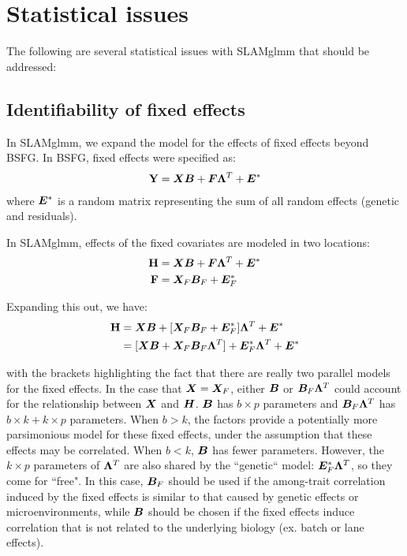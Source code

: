 \documentclass[11pt]{amsart}
\newcommand*{\B}[1]{\ifmmode\bm{#1}\else\textbf{#1}\fi}
\begin{document}
\section{Statistical issues}
The following are several statistical issues with SLAMglmm that should be addressed:

\subsection{Identifiability of fixed effects}
In SLAMglmm, we expand the model for the effects of fixed effects beyond BSFG. In BSFG, fixed effects were specified as:
\begin{align*}
\B{Y} = \B{X}\B{B} + \B{F}\B{\Lambda}^T + \B{E}^*
\end{align*}
\noindent where $\B{E}^*$ is a random matrix representing the sum of all random effects (genetic and residuals).

In SLAMglmm, effects of the fixed covariates are modeled in two locations:
\begin{align*}
\B{H} &= \B{X}\B{B} + \B{F}\B{\Lambda}^T + \B{E}^* \\
\B{F} &= \B{X}_F\B{B}_F + \B{E}^*_F
\end{align*}

Expanding this out, we have:
\begin{align*}
\B{H} &= \B{X}\B{B} + [\B{X}_F\B{B}_F + \B{E}^*_F]\B{\Lambda}^T + \B{E}^* \\
&= [\B{X}\B{B} + \B{X}_F\B{B}_F\B{\Lambda}^T] + \B{E}^*_F\B{\Lambda}^T + \B{E}^* 
\end{align*}

\noindent with the brackets highlighting the fact that there are really two parallel models for the fixed effects. In the case that $\B{X} = \B{X}_F$, either $\B{B}$ or $\B{B}_F\B{\Lambda}^T$ could account for the relationship between $\B{X}$ and $\B{H}$. $\B{B}$ has $b \times p$ parameters and $\B{B}_F\B{\Lambda}^T$ has $b \times k + k \times p$ parameters. When $b > k$, the factors provide a potentially more parsimonious model for these fixed effects, under the assumption that these effects may be correlated. When $b < k$, $\B{B}$ has fewer parameters. However, the $k \times p$ parameters of $\B{\Lambda}^T$ are also shared by the ``genetic`` model: $\B{E}^*_F\B{\Lambda}^T$, so they come for ``free". In this case, $\B{B}_F$ should be used if the among-trait correlation induced by the fixed effects is similar to that caused by genetic effects or microenvironments, while $\B{B}$ should be chosen if the fixed effects induce correlation that is not related to the underlying biology (ex. batch or lane effects).
\end{document}
